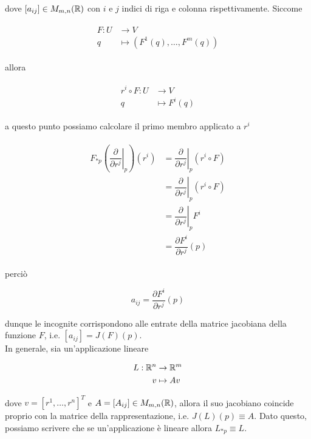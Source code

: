 dove $ [a_{ij}] \in M_{m,n}(\mathbb{R}) $ con $ i $ e $ j $ indici di riga e colonna rispettivamente. Siccome

\begin{align}
	\begin{split}
		F : U &\to V\\
		q &\mapsto (F^{1}(q),\dots,F^{m}(q))
	\end{split}
\end{align}

allora

\begin{align}
	\begin{split}
		r^{i} \circ F : U &\to V\\
		q &\mapsto F^{i}(q)
	\end{split}
\end{align}

a questo punto possiamo calcolare il primo membro applicato a $ r^{i} $

\begin{align}
	\begin{split}
		F_{*p} \left( \left. \dfrac{\partial}{\partial r^{j}} \right|_{p} \right) (r^{i}) &= \left. \dfrac{\partial}{\partial r^{j}} \right|_{p} (r^{i} \circ F)\\
		&= \left. \dfrac{\partial}{\partial r^{j}} \right|_{p} (r^{i} \circ F)\\
		&= \left. \dfrac{\partial}{\partial r^{j}} \right|_{p} F^{i}\\
		&= \dfrac{\partial F^{i}}{\partial r^{j}} (p)
	\end{split}
\end{align}

perciò

\begin{equation}
	a_{ij} = \dfrac{\partial F^{i}}{\partial r^{j}} (p)
\end{equation}

dunque le incognite corrispondono alle entrate della matrice jacobiana della funzione $ F $, i.e. $ [a_{ij}] = J(F)(p) $.\\
In generale, sia un'applicazione lineare

\begin{align}
	\begin{split}
		L : \mathbb{R}^{n} &\to \mathbb{R}^{m}\\
		v &\mapsto A v
	\end{split}
\end{align}

dove $ v = [r^{1},\dots,r^{n}]^{T} $ e $ A = [A_{ij}] \in M_{m,n}(\mathbb{R}) $, allora il suo jacobiano coincide proprio con la matrice della rappresentazione, i.e. $ J(L)(p) \equiv A $. Dato questo, possiamo scrivere che se un'applicazione è lineare allora $ L_{*p} \equiv L $.

